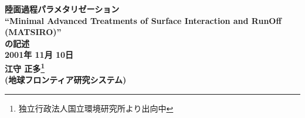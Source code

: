 \documentclass[12pt,a4paper,onecolumn]{jarticle}
\author{}
\date{\today}
\begin{document}
\begin{center}
{\LARGE \bf
陸面過程パラメタリゼーション\\
``Minimal Advanced Treatments of Surface Interaction and RunOff
(MATSIRO)''\\
の記述
}
\bigskip \\
{\Large \bf
2001年 11月 10日 \medskip\\
江守 正多\footnote{独立行政法人国立環境研究所より出向中}
\\
(地球フロンティア研究システム)
\bigskip \\
}
\end{center}
%
	\maketitle
	\tableofcontents
	\clearpage
	
	
	
	
	
	
	
\end{document}
